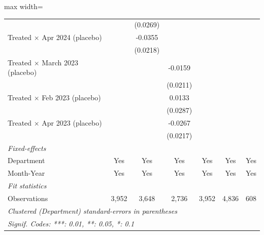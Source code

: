 \begin{table}[htbp]
\begin{adjustbox}{max width=\textwidth}
\begin{tabular}{lcccccc}
                                             &                 & (0.0269)         &                  &                 &                 &   \\   
      Treated $\times$ Apr 2024 (placebo)    &                 & -0.0355          &                  &                 &                 &   \\   
                                             &                 & (0.0218)         &                  &                 &                 &   \\   
      Treated $\times$ March 2023 (placebo)  &                 &                  & -0.0159          &                 &                 &   \\   
                                             &                 &                  & (0.0211)         &                 &                 &   \\   
      Treated $\times$ Feb 2023 (placebo)    &                 &                  & 0.0133           &                 &                 &   \\   
                                             &                 &                  & (0.0287)         &                 &                 &   \\   
      Treated $\times$ Apr 2023 (placebo)    &                 &                  & -0.0267          &                 &                 &   \\   
                                             &                 &                  & (0.0217)         &                 &                 &   \\   
      \midrule
      \emph{Fixed-effects}\\
      Department                             & Yes             & Yes              & Yes              & Yes             & Yes             & Yes\\  
      Month-Year                             & Yes             & Yes              & Yes              & Yes             & Yes             & Yes\\  
      \midrule
      \emph{Fit statistics}\\
      Observations                           & 3,952           & 3,648            & 2,736            & 3,952           & 4,836           & 608\\  
      \midrule \midrule
      \multicolumn{7}{l}{\emph{Clustered (Department) standard-errors in parentheses}}\\
      \multicolumn{7}{l}{\emph{Signif. Codes: ***: 0.01, **: 0.05, *: 0.1}}\\
   \end{tabular}
   \end{adjustbox}


\end{table}
